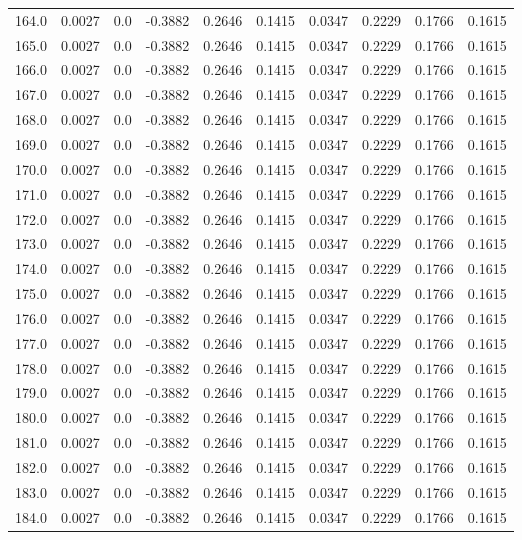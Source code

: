 \begin{longtable}{lrrrrrrrrr}
164.0 & 0.0027 & 0.0 & -0.3882 & 0.2646 & 0.1415 & 0.0347 & 0.2229 & 0.1766 & 0.1615 \\
165.0 & 0.0027 & 0.0 & -0.3882 & 0.2646 & 0.1415 & 0.0347 & 0.2229 & 0.1766 & 0.1615 \\
166.0 & 0.0027 & 0.0 & -0.3882 & 0.2646 & 0.1415 & 0.0347 & 0.2229 & 0.1766 & 0.1615 \\
167.0 & 0.0027 & 0.0 & -0.3882 & 0.2646 & 0.1415 & 0.0347 & 0.2229 & 0.1766 & 0.1615 \\
168.0 & 0.0027 & 0.0 & -0.3882 & 0.2646 & 0.1415 & 0.0347 & 0.2229 & 0.1766 & 0.1615 \\
169.0 & 0.0027 & 0.0 & -0.3882 & 0.2646 & 0.1415 & 0.0347 & 0.2229 & 0.1766 & 0.1615 \\
170.0 & 0.0027 & 0.0 & -0.3882 & 0.2646 & 0.1415 & 0.0347 & 0.2229 & 0.1766 & 0.1615 \\
171.0 & 0.0027 & 0.0 & -0.3882 & 0.2646 & 0.1415 & 0.0347 & 0.2229 & 0.1766 & 0.1615 \\
172.0 & 0.0027 & 0.0 & -0.3882 & 0.2646 & 0.1415 & 0.0347 & 0.2229 & 0.1766 & 0.1615 \\
173.0 & 0.0027 & 0.0 & -0.3882 & 0.2646 & 0.1415 & 0.0347 & 0.2229 & 0.1766 & 0.1615 \\
174.0 & 0.0027 & 0.0 & -0.3882 & 0.2646 & 0.1415 & 0.0347 & 0.2229 & 0.1766 & 0.1615 \\
175.0 & 0.0027 & 0.0 & -0.3882 & 0.2646 & 0.1415 & 0.0347 & 0.2229 & 0.1766 & 0.1615 \\
176.0 & 0.0027 & 0.0 & -0.3882 & 0.2646 & 0.1415 & 0.0347 & 0.2229 & 0.1766 & 0.1615 \\
177.0 & 0.0027 & 0.0 & -0.3882 & 0.2646 & 0.1415 & 0.0347 & 0.2229 & 0.1766 & 0.1615 \\
178.0 & 0.0027 & 0.0 & -0.3882 & 0.2646 & 0.1415 & 0.0347 & 0.2229 & 0.1766 & 0.1615 \\
179.0 & 0.0027 & 0.0 & -0.3882 & 0.2646 & 0.1415 & 0.0347 & 0.2229 & 0.1766 & 0.1615 \\
180.0 & 0.0027 & 0.0 & -0.3882 & 0.2646 & 0.1415 & 0.0347 & 0.2229 & 0.1766 & 0.1615 \\
181.0 & 0.0027 & 0.0 & -0.3882 & 0.2646 & 0.1415 & 0.0347 & 0.2229 & 0.1766 & 0.1615 \\
182.0 & 0.0027 & 0.0 & -0.3882 & 0.2646 & 0.1415 & 0.0347 & 0.2229 & 0.1766 & 0.1615 \\
183.0 & 0.0027 & 0.0 & -0.3882 & 0.2646 & 0.1415 & 0.0347 & 0.2229 & 0.1766 & 0.1615 \\
184.0 & 0.0027 & 0.0 & -0.3882 & 0.2646 & 0.1415 & 0.0347 & 0.2229 & 0.1766 & 0.1615 \\

\end{longtable}
